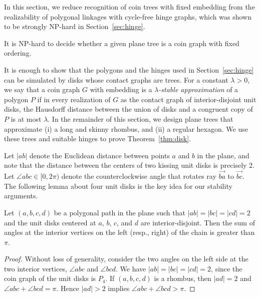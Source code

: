 \documentclass[runningheads]{article}
\begin{document}
In this section, we reduce recognition of coin trees with fixed embedding from the realizability of polygonal linkages with cycle-free hinge graphs, which was shown to be strongly NP-hard in Section~\ref{sec:hinge}.

\begin{theorem}\label{thm:disk}
It is NP-hard to decide whether a given plane tree is a coin graph with fixed ordering.
\end{theorem}

It is enough to show that the polygons and the hinges used in Section~\ref{sec:hinge} can be simulated
by disks whose contact graphs are trees.
For a constant $\lambda>0$, we say that a coin graph $G$ with embedding is a \emph{$\lambda$-stable approximation} of a polygon $P$ if in every realization of $G$ as the contact graph of interior-disjoint unit disks, the Hausdorff distance between the union of disks and a congruent copy of $P$ is at most $\lambda$. In the remainder of this section,
 we design plane trees that approximate (i) a long and skinny rhombus, and (ii) a regular hexagon. We use these trees and suitable hinges to prove Theorem~\ref{thm:disk}.


Let $|ab|$ denote the Euclidean distance between points $a$ and $b$ in the plane,
and note that the distance between the centers of two kissing unit disks is precisely 2.
Let $\angle abc\in [0,2\pi)$ denote the counterclockwise angle that rotates
ray $\overrightarrow{ba}$ to $\overrightarrow{bc}$.
%
The following lemma about four unit disks is the key idea for our stability arguments.

\begin{lemma}\label{lem:P4lemma}
Let $(a,b,c,d)$ be a polygonal path in the plane such that $|ab|=|bc|=|cd|=2$
and the unit disks centered at $a$, $b$, $c$, and $d$ are interior-disjoint.
Then the sum of angles at the interior vertices on the left (resp., right) 
of the chain is greater than $\pi$.
\end{lemma}
\begin{proof}
Without loss of generality, consider the two angles on the left
side at the two interior vertices, $\angle abc$ and $\angle bcd$.
We have $|ab|=|bc|=|cd|=2$, since the coin graph of the unit disks is $P_4$.
If $(a,b,c,d)$ is a rhombus, then $|ad|=2$ and $\angle abc+\angle bcd=\pi$.
Hence $|ad|>2$ implies $\angle abc+\angle bcd>\pi$.
\end{proof}
\end{document}
